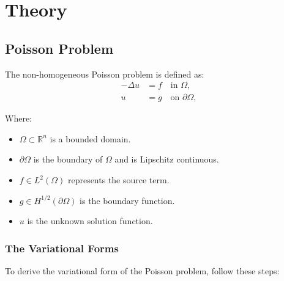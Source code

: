 \documentclass[class=article, crop=false]{standalone}
\begin{document}
\section{Theory}

\subsection{Poisson Problem}
The non-homogeneous Poisson problem is defined as:
\begin{align}
    -\Delta u &= f \quad \text{in } \Omega, \label{eq:poisson}\\
    u &= g \quad \text{on } \partial \Omega, \label{eq:dirichlet}
\end{align}

Where:
\begin{itemize}
    \item $\Omega \subset \mathbb{R}^n$ is a bounded domain.
    \item $\partial\Omega$ is the boundary of $\Omega$ and is Lipschitz continuous.
    \item $f \in L^2(\Omega)$ represents the source term.
    \item $g \in H^{1/2}(\partial\Omega)$ is the boundary function.
    \item $u$ is the unknown solution function.
\end{itemize}


\subsubsection{The Variational Forms}
To derive the variational form of the Poisson problem, follow these steps:
\end{document}
